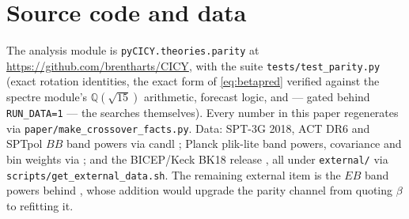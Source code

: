 \documentclass[11pt,a4paper]{article}
\theoremstyle{plain}
\theoremstyle{definition}
\begin{document}
\newpage

\appendix
\footnotesize

\section{Source code and data}
\label{sec:source}

The analysis module is \texttt{pyCICY.theories.parity} at
\url{https://github.com/brentharts/CICY}, with the suite
\texttt{tests/test\_parity.py} (exact rotation identities, the exact
form of \cref{eq:betapred} verified against the spectre module's
$\mathbb{Q}(\sqrt{15})$ arithmetic, forecast logic, and --- gated
behind \texttt{RUN\_DATA=1} --- the searches themselves). Every number
in this paper regenerates via \texttt{paper/make\_crossover\_facts.py}.
Data: SPT-3G 2018, ACT DR6 and SPTpol $BB$ band powers via candl
\cite{candl}; Planck plik-lite band powers, covariance and bin weights
via \cite{PlanckLitePy}; and the BICEP/Keck BK18 release \cite{BK18},
all under \texttt{external/} via
\texttt{scripts/get\_external\_data.sh}. The remaining external item
is the $EB$ band powers behind \cite{EskiltKomatsu2022,Eskilt2026},
whose addition would upgrade the parity channel from quoting $\beta$
to refitting it.
\end{document}
